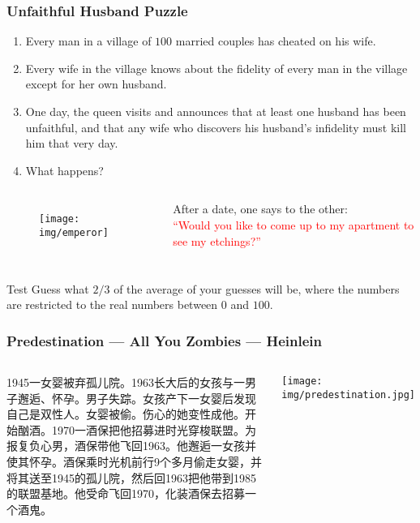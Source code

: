 \documentclass[UTF8,11pt,colorlinks,compress,openany]{beamer}%
\begin{document}
\begin{frame}\frametitle{Unfaithful Husband Puzzle}
	\begin{problem}
		\begin{enumerate}
			\item Every man in a village of $100$ married couples has cheated on his wife.
			\item Every wife in the village knows about the fidelity of every man in the village except for her own husband.
			\item One day, the queen visits and announces that at least one husband has been unfaithful, and that any wife who discovers his husband's infidelity must kill him that very day.
			\item What happens?
		\end{enumerate}
	\end{problem}\vspace{-2ex}
\begin{columns}
	\begin{figure}
	\texttt{[image: img/emperor]}
	\end{figure}
	After a date, one says to the other:\\
	\textcolor{red}{``Would you like to come up to my apartment to see my etchings?''}
\end{columns}
\end{frame}

\begin{frame}\frametitle{}
\begin{block}{Test}
Guess what $2/3$ of the average of your guesses will be, where the numbers are restricted to the real numbers between $0$ and $100$.
\end{block}
\end{frame}

\begin{frame}\frametitle{Predestination --- All You Zombies --- Heinlein}
\begin{columns}
\begin{block}{}
1945一女婴被弃孤儿院。1963长大后的女孩与一男子邂逅、怀孕。男子失踪。女孩产下一女婴后发现自己是双性人。女婴被偷。伤心的她变性成他。开始酗酒。1970一酒保把他招募进时光穿梭联盟。为报复负心男，酒保带他飞回1963。他邂逅一女孩并使其怀孕。酒保乘时光机前行9个多月偷走女婴，并将其送至1945的孤儿院，然后回1963把他带到1985的联盟基地。他受命飞回1970，化装酒保去招募一个酒鬼。
\end{block}
\texttt{[image: img/predestination.jpg]}
\end{columns}
\end{frame}
\end{document}
